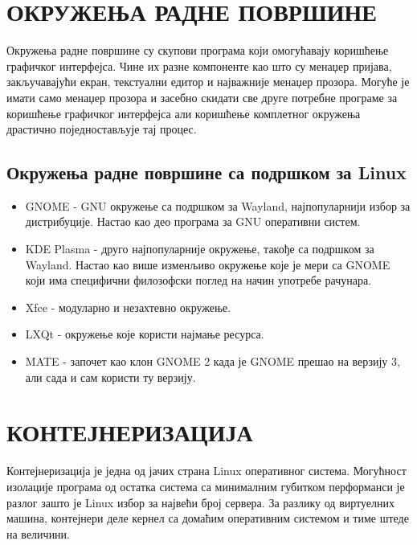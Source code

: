 \documentclass[a4paper,14pt]{article}
\begin{document}
\section{ОКРУЖЕЊА РАДНЕ ПОВРШИНЕ}
Окружења радне површине су скупови програма који омогућавају коришћење графичког интерфејса. Чине их разне компоненте као што су менаџер пријава, закључавајући екран, текстуални едитор и најважније менаџер прозора. Могуће је имати само менаџер прозора и засебно скидати све друге потребне програме за коришћење графичког интерфејса али коришћење комплетног окружења драстично поједностављује тај процес.
\subsection{Окружења радне површине са подршком за Linux}
\begin{itemize}
\item GNOME\cite{gnome} - GNU окружење са подршком за Wayland, најпопуларнији избор за дистрибуције. Настао као део програма за GNU оперативни систем.
\item KDE Plasma\cite{kdeplasma} - друго најпопуларније окружење, такође са подршком за Wayland. Настао као више изменљиво окружење које је мери са GNOME који има специфични филозофски поглед на начин употребе рачунара.
\item Xfce\cite{xfce} - модуларно и незахтевно окружење.
\item LXQt\cite{lxqt} - окружење које користи најмање ресурса.
\item MATE\cite{mate} - започет као клон GNOME 2 када је GNOME прешао на верзију 3, али сада и сам користи ту верзију.
\end{itemize}
\newpage

\section{КОНТЕЈНЕРИЗАЦИЈА}
Контејнеризација је једна од јачих страна Linux оперативног система. Могућност изолације програма од остатка система са минималним губитком перформанси је разлог зашто је Linux избор за највећи број сервера. За разлику од виртуелних машина, контејнери деле кернел са домаћим оперативним системом и тиме штеде на величини.
\end{document}
